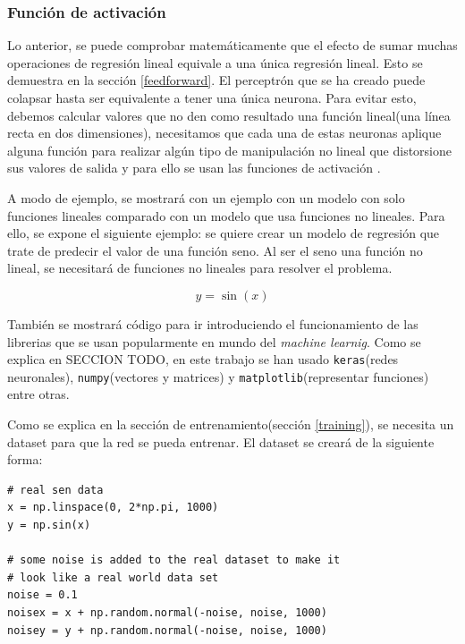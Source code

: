 \subsubsection{Función de activación}\label{activationfunction}

Lo anterior, se puede comprobar matemáticamente que el efecto de sumar muchas operaciones de regresión lineal equivale a una única regresión lineal. Esto se demuestra en la sección \ref{feedforward}. El perceptrón que se ha creado puede colapsar hasta ser equivalente a tener una única neurona. Para evitar esto, debemos calcular valores que no den como resultado una función lineal(una línea recta en dos dimensiones), necesitamos que cada una de estas neuronas aplique alguna función para realizar algún tipo de manipulación no lineal que distorsione sus valores de salida y para ello se usan las funciones de activación \cite{nielsen}.
\newline

A modo de ejemplo, se mostrará con un ejemplo con un modelo con solo funciones lineales comparado con un modelo que usa funciones no lineales. Para ello, se expone el siguiente ejemplo: se quiere crear un modelo de regresión que trate de predecir el valor de una función seno. Al ser el seno una función no lineal, se necesitará de funciones no lineales para resolver el problema.

\begin{equation}
    y = \sin(x)
\end{equation}

También se mostrará código para ir introduciendo el funcionamiento de las librerias que se usan popularmente en mundo del \textit{machine learnig}. Como se explica en SECCION TODO, en este trabajo se han usado \verb|keras|(redes neuronales), \verb|numpy|(vectores y matrices) y \verb|matplotlib|(representar funciones) entre otras. 
\newline

Como se explica en la sección de entrenamiento(sección \ref{training}), se necesita un dataset para que la red se pueda entrenar. El dataset se creará de la siguiente forma:


\begin{verbatim}
# real sen data
x = np.linspace(0, 2*np.pi, 1000)
y = np.sin(x)

# some noise is added to the real dataset to make it 
# look like a real world data set
noise = 0.1
noisex = x + np.random.normal(-noise, noise, 1000)
noisey = y + np.random.normal(-noise, noise, 1000)
\end{verbatim}

